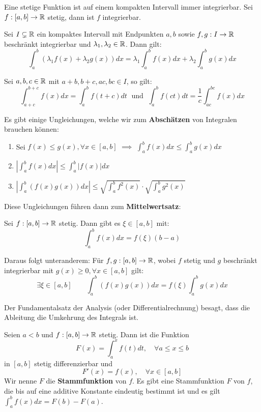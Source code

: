 Eine stetige Funktion ist auf einem kompakten Intervall immer integrierbar. Sei $f: [a,b] \to \mathbb{R}$
stetig, dann ist $f$ integrierbar.



Sei $I \subsetneq \mathbb{R}$ ein kompaktes Intervall mit Endpunkten $a,b$ sowie $f,g : I \to \mathbb{R}$
beschränkt integrierbar und $\lambda_1, \lambda_2 \in \mathbb{R}$. Dann gilt:
$$\int_a^b(\lambda_1f(x) + \lambda_2g(x))dx = \lambda_1 \int_a^b f(x)dx + \lambda_2 \int_a^b g(x)dx$$

Sei $a,b,c \in \mathbb{R}$ mit $a+b, b+c, ac, bc \in I$, so gilt:
$$\int_{a+c}^{b+c}f(x)dx = \int_a^b f(t+c)dt \; \text{ und } \; \int_{a}^{b}f(ct)dt = \frac{1}{c} \int_{ac}^{bc} f(x)dx$$



Es gibt einige Ungleichungen, welche wir zum \textbf{Abschätzen} von Integralen brauchen können:
\begin{enumerate}[label = (\arabic*)]
    \item Sei $f(x) \leq g(x), \forall x \in [a,b]$ $\implies$ $\int_a^b f(x)dx \leq \int_a^b g(x)dx$
    \item $| \int_a^b f(x)dx | \leq \int_a^b |f(x)|dx$
    \item $| \int_a^b (f(x)g(x))dx | \leq \sqrt{\int_a^b f^2(x)} \cdot \sqrt{\int_a^b g^2(x)}$
\end{enumerate}

Diese Ungleichungen führen dann zum \textbf{Mittelwertsatz}:
\begin{tcolorbox}
    \Satz Sei $f : [a,b] \to \mathbb{R}$ stetig. Dann gibt es $\xi \in [a,b]$ mit:
    $$\int_a^b f(x)dx = f(\xi)(b-a)$$
\end{tcolorbox}

Daraus folgt unteranderem: Für $f,g : [a,b] \to \mathbb{R}$, wobei $f$ stetig und $g$
beschränkt integrierbar mit $g(x) \geq 0, \forall x \in [a,b]$ gilt:
$$\exists \xi \in [a,b] \quad \quad \int_a^b (f(x)g(x))dx = f(\xi)\int_a^b g(x)dx$$


\columnbreak



Der Fundamentalsatz der Analysis (oder Differentialrechnung) besagt, dass die Ableitung die Umkehrung des Integrals ist.

\begin{tcolorbox}
    Seien $a < b$ und $f : [a,b] \to \mathbb{R}$ stetig. Dann ist die Funktion
    $$F(x) = \int_a^x f(t)dt, \quad \forall a \leq x \leq b$$
    in $[a,b]$ stetig differenzierbar und
    $$F'(x) = f(x), \quad \forall x \in [a,b]$$
    Wir nenne $F$ die \textbf{Stammfunktion} von $f$. Es gibt eine Stammfunktion $F$ von $f$, die bis
    auf eine additive Konstante eindeutig bestimmt ist und es gilt $\int_a^b f(x)dx = F(b) - F(a)$.
\end{tcolorbox}


